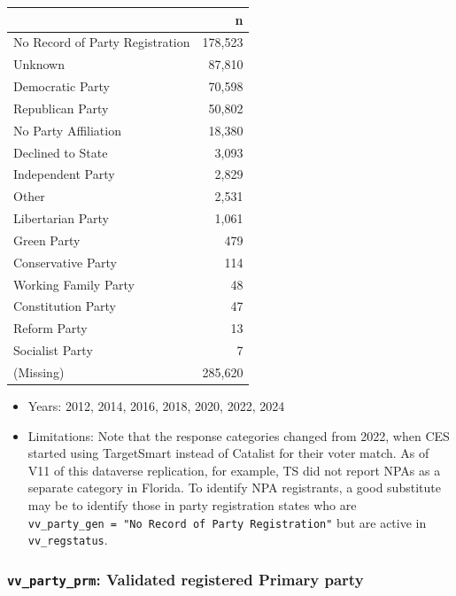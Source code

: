 \documentclass[10pt,article,oneside]{memoir}
\begin{document}
\begin{table}[H]
\centering
\begin{tabular}[t]{lr}
\toprule
 & n\\
\midrule
No Record of Party Registration & 178,523\\
Unknown & 87,810\\
Democratic Party & 70,598\\
Republican Party & 50,802\\
No Party Affiliation & 18,380\\
Declined to State & 3,093\\
Independent Party & 2,829\\
Other & 2,531\\
Libertarian Party & 1,061\\
Green Party & 479\\
Conservative Party & 114\\
Working Family Party & 48\\
Constitution Party & 47\\
Reform Party & 13\\
Socialist Party & 7\\
(Missing) & 285,620\\
\bottomrule
\end{tabular}
\end{table}

\begin{itemize}
\tightlist
\item
  Years: 2012, 2014, 2016, 2018, 2020, 2022, 2024
\item
  Limitations: Note that the response categories changed from 2022, when
  CES started using TargetSmart instead of Catalist for their voter
  match. As of V11 of this dataverse replication, for example, TS did
  not report NPAs as a separate category in Florida. To identify NPA
  registrants, a good substitute may be to identify those in party
  registration states who are
  \texttt{vv\_party\_gen\ =\ "No\ Record\ of\ Party\ Registration"} but
  are active in \texttt{vv\_regstatus}.
\end{itemize}

\subsubsection{\texorpdfstring{\texttt{vv\_party\_prm}: Validated
registered Primary
party}{vv\_party\_prm: Validated registered Primary party}}\label{vv_party_prm-validated-registered-primary-party}
\end{document}

